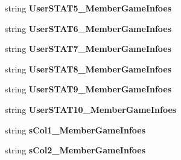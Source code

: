\begin{DoxyCompactItemize}
\item 
string {\bfseries User\+S\+T\+A\+T5\+\_\+\+Member\+Game\+Infoes}\hypertarget{a00124_ab83da150dc250b40a8c90ee25e2175d9}{}\label{a00124_ab83da150dc250b40a8c90ee25e2175d9}

\item 
string {\bfseries User\+S\+T\+A\+T6\+\_\+\+Member\+Game\+Infoes}\hypertarget{a00124_a87670362a9762e4c079bc103f663475c}{}\label{a00124_a87670362a9762e4c079bc103f663475c}

\item 
string {\bfseries User\+S\+T\+A\+T7\+\_\+\+Member\+Game\+Infoes}\hypertarget{a00124_ae93f76db3839aff99dd7a6f74306628e}{}\label{a00124_ae93f76db3839aff99dd7a6f74306628e}

\item 
string {\bfseries User\+S\+T\+A\+T8\+\_\+\+Member\+Game\+Infoes}\hypertarget{a00124_ada69a4168e226330f03b8dd646306f25}{}\label{a00124_ada69a4168e226330f03b8dd646306f25}

\item 
string {\bfseries User\+S\+T\+A\+T9\+\_\+\+Member\+Game\+Infoes}\hypertarget{a00124_a660e362d16fc14da78e97d62dd8be7e7}{}\label{a00124_a660e362d16fc14da78e97d62dd8be7e7}

\item 
string {\bfseries User\+S\+T\+A\+T10\+\_\+\+Member\+Game\+Infoes}\hypertarget{a00124_a6f2537fa1be7f6625df8deca635879bc}{}\label{a00124_a6f2537fa1be7f6625df8deca635879bc}

\item 
string {\bfseries s\+Col1\+\_\+\+Member\+Game\+Infoes}\hypertarget{a00124_a523f99975711e9862a6066a862646d0e}{}\label{a00124_a523f99975711e9862a6066a862646d0e}

\item 
string {\bfseries s\+Col2\+\_\+\+Member\+Game\+Infoes}\hypertarget{a00124_aa7fa27e9c91970ab576da98fc1cee5d2}{}\label{a00124_aa7fa27e9c91970ab576da98fc1cee5d2}


\end{DoxyCompactItemize}
